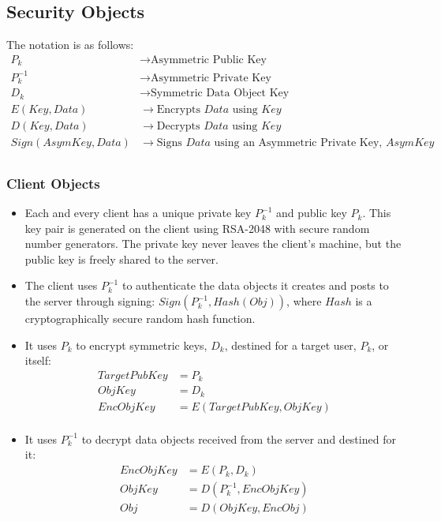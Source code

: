 \documentclass{article}
\begin{document}
\subsection*{Security Objects}
The notation is as follows:
\begin{align*}
  P_k &\rightarrow \text{Asymmetric Public Key} \\
  P_k^{-1} &\rightarrow \text{Asymmetric Private Key} \\
  D_k &\rightarrow \text{Symmetric Data Object Key} \\
  E(Key, Data) &\rightarrow \text{Encrypts $Data$ using $Key$} \\
  D(Key, Data) &\rightarrow \text{Decrypts $Data$ using $Key$} \\
  Sign(AsymKey, Data) &\rightarrow \text{Signs $Data$ using an Asymmetric Private Key, $AsymKey$} \\
\end{align*}
\subsubsection*{Client Objects}
\begin{itemize}
  \item Each and every client has a unique private key $P_k^{-1}$ and public key $P_k$. This key pair is generated on the client using RSA-2048 with secure random number generators. The private key never leaves the client's machine, but the public key is freely shared to the server. 

  \item The client uses $P_k^{-1}$ to authenticate the data objects it creates and posts to the server through signing: $Sign(P_k^{-1}, Hash(Obj))$, where $Hash$ is a cryptographically secure random hash function.
  \item It uses $P_k$ to encrypt symmetric keys, $D_k$, destined for a target user, $P_k$, or itself:
    \begin{align*}
      TargetPubKey &= P_k \\
      ObjKey &= D_k \\
      EncObjKey &= E(TargetPubKey, ObjKey) \\
    \end{align*}
  \item It uses $P_k^{-1}$ to decrypt data objects received from the server and destined for it: 
    \begin{align*}
      EncObjKey &= E(P_k, D_k) \\ 
      ObjKey &= D(P_k^{-1}, EncObjKey) \\
      Obj &= D(ObjKey, EncObj) \\
    \end{align*}
\end{itemize}
\end{document}
